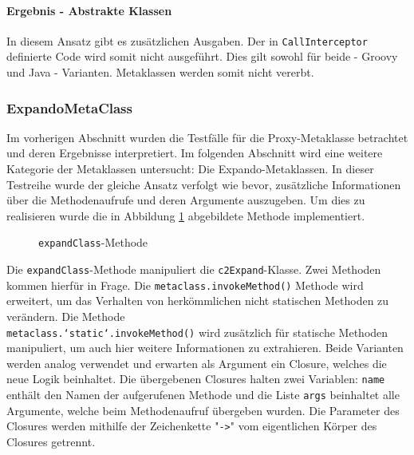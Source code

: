

\paragraph{Ergebnis - Abstrakte Klassen}

In diesem Ansatz gibt es zusätzlichen Ausgaben.
Der in \texttt{CallInterceptor} definierte Code wird somit nicht ausgeführt.
Dies gilt sowohl für beide - Groovy und Java - Varianten.
Metaklassen werden somit nicht vererbt.




\subsubsection{ExpandoMetaClass}
Im vorherigen Abschnitt wurden die Testfälle für die Proxy-Metaklasse betrachtet und deren Ergebnisse interpretiert. 
Im folgenden Abschnitt wird eine weitere Kategorie der Metaklassen untersucht: Die Expando-Metaklassen. 
In dieser Testreihe wurde der gleiche Ansatz verfolgt wie bevor, zusätzliche Informationen über die Methodenaufrufe und deren Argumente auszugeben. 
Um dies zu realisieren wurde die in Abbildung \ref{fig:MetaTester-expandClass} abgebildete Methode implementiert.


\begin{figure}[hbt!]
	
	\caption{\texttt{expandClass}-Methode}
	\label{fig:MetaTester-expandClass}
\end{figure}


Die \texttt{expandClass}-Methode manipuliert die \texttt{c2Expand}-Klasse. 
Zwei Methoden kommen hierfür in Frage. 
Die \texttt{metaclass.invokeMethod()} Methode wird erweitert, um das Verhalten von herkömmlichen nicht statischen Methoden zu verändern. 
Die Methode \\ \texttt{metaclass.‘static‘.invokeMethod()} wird zusätzlich für statische Methoden manipuliert, um auch hier weitere Informationen zu extrahieren. 
Beide Varianten werden analog verwendet und erwarten als Argument ein Closure, welches die neue Logik beinhaltet. 
Die übergebenen Closures halten zwei Variablen: \texttt{name} enthält den Namen der aufgerufenen Methode und die Liste \texttt{args} beinhaltet alle Argumente, welche beim Methodenaufruf übergeben wurden. 
Die Parameter des Closures werden mithilfe der Zeichenkette "\texttt{->}" vom eigentlichen Körper des Closures getrennt. 


